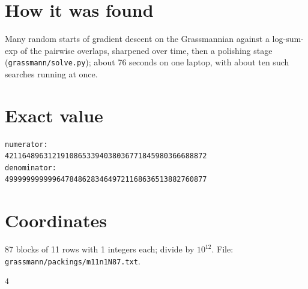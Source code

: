 \documentclass[11pt,a4paper]{article}
\begin{document}
\section{How it was found}
Many random starts of gradient descent on the Grassmannian against a log-sum-exp of the pairwise overlaps, sharpened over time, then a polishing stage (\texttt{grassmann/solve.py}); about 76 seconds on one laptop, with about ten such searches running at once.


\appendix
\section{Exact value}
{\small
\begin{verbatim}
numerator:
42116489631219108653394038036771845980366688872
denominator:
49999999999964784862834649721168636513882760877
\end{verbatim}}

\section{Coordinates}
87 blocks of 11 rows with 1 integers each; divide by $10^{12}$. File: \texttt{grassmann/packings/m11n1N87.txt}.
{\tiny
\begin{multicols}{4}
\end{multicols}}
\end{document}
